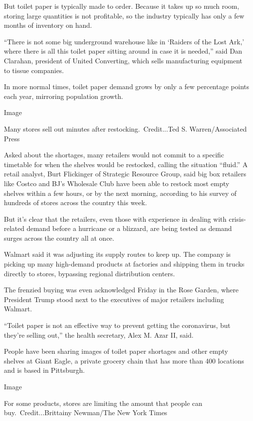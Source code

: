 But toilet paper is typically made to order. Because it takes up so much
room, storing large quantities is not profitable, so the industry
typically has only a few months of inventory on hand.

``There is not some big underground warehouse like in `Raiders of the
Lost Ark,' where there is all this toilet paper sitting around in case
it is needed,'' said Dan Clarahan, president of United Converting, which
sells manufacturing equipment to tissue companies.

In more normal times, toilet paper demand grows by only a few percentage
points each year, mirroring population growth.

Image

Many stores sell out minutes after restocking.~Credit...Ted S.
Warren/Associated Press

Asked about the shortages, many retailers would not commit to a specific
timetable for when the shelves would be restocked, calling the situation
``fluid.'' A retail analyst, Burt Flickinger of Strategic Resource
Group, said big box retailers like Costco and BJ's Wholesale Club have
been able to restock most empty shelves within a few hours, or by the
next morning, according to his survey of hundreds of stores across the
country this week.

But it's clear that the retailers, even those with experience in dealing
with crisis-related demand before a hurricane or a blizzard, are being
tested as demand surges across the country all at once.

Walmart said it was adjusting its supply routes to keep up. The company
is picking up many high-demand products at factories and shipping them
in trucks directly to stores, bypassing regional distribution centers.

The frenzied buying was even acknowledged Friday in the Rose Garden,
where President Trump stood next to the executives of major retailers
including Walmart.

``Toilet paper is not an effective way to prevent getting the
coronavirus, but they're selling out,'' the health secretary, Alex M.
Azar II, said.

People have been sharing images of toilet paper shortages and other
empty shelves at Giant Eagle, a private grocery chain that has more than
400 locations and is based in Pittsburgh.

Image

For some products, stores are limiting the amount that people can
buy.~Credit...Brittainy Newman/The New York Times


